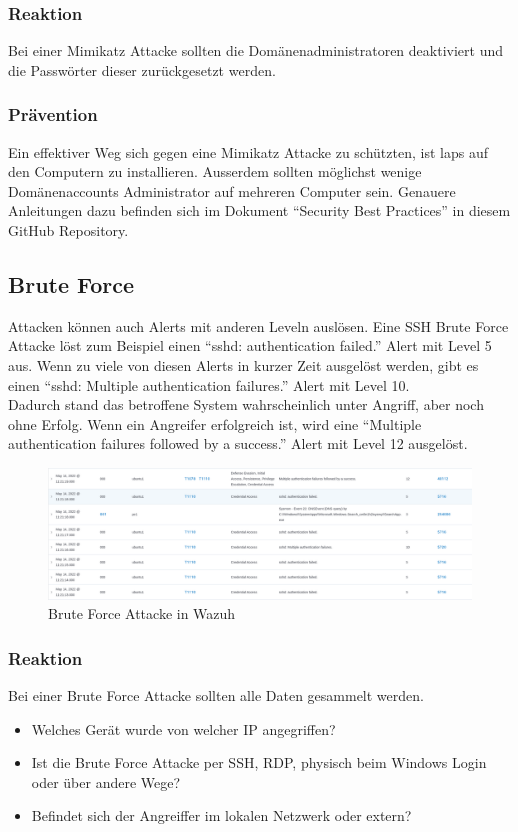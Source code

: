 \subsubsection{Reaktion}
Bei einer Mimikatz Attacke sollten die Domänenadministratoren deaktiviert und die Passwörter dieser zurückgesetzt werden.

\subsubsection{Prävention}
Ein effektiver Weg sich gegen eine Mimikatz Attacke zu schützten, ist \acrshort{laps} auf den Computern zu installieren. 
Ausserdem sollten möglichst wenige Domänenaccounts Administrator auf mehreren Computer sein.
Genauere Anleitungen dazu befinden sich im Dokument ``Security Best Practices'' in diesem GitHub Repository.

\subsection{Brute Force}
Attacken können auch Alerts mit anderen Leveln auslösen. 
Eine SSH Brute Force Attacke löst zum Beispiel einen ``sshd: authentication failed.'' Alert mit Level 5 aus.
Wenn zu viele von diesen Alerts in kurzer Zeit ausgelöst werden, gibt es einen ``sshd: Multiple authentication failures.'' Alert mit Level 10.\\

Dadurch stand das betroffene System wahrscheinlich unter Angriff, aber noch ohne Erfolg.
Wenn ein Angreifer erfolgreich ist, wird eine ``Multiple authentication failures followed by a success.'' Alert mit Level 12 ausgelöst.
\begin{figure}[H]
    \centering
    \includegraphics[width=\linewidth]{../img/brute-force.png}
    \caption{Brute Force Attacke in Wazuh}
\end{figure}

\subsubsection{Reaktion}
Bei einer Brute Force Attacke sollten alle Daten gesammelt werden.
\begin{itemize}
    \item Welches Gerät wurde von welcher IP angegriffen?
    \item Ist die Brute Force Attacke per SSH, RDP, physisch beim Windows Login oder über andere Wege? 
    \item Befindet sich der Angreiffer im lokalen Netzwerk oder extern?
\end{itemize}


